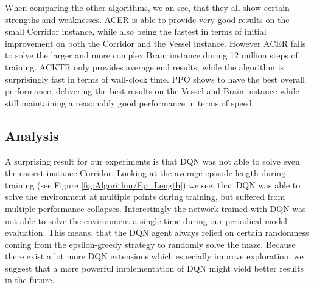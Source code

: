 When comparing the other algorithms, we an see, that they all show certain strengths and weaknesses. ACER is able to provide very good results on the small Corridor instance, while also being the fastest in terms of initial improvement on both the Corridor and the Vessel instance. However ACER fails to solve the larger and more complex Brain instance during 12 million steps of training. ACKTR only provides average end results, while the algorithm is surprisingly fast in terms of wall-clock time. PPO shows to have the best overall performance, delivering the best results on the Vessel and Brain instance while still maintaining a reasonably good performance in terms of speed.   

\subsection{Analysis}
A surprising result for our experiments is that DQN was not able to solve even the easiest instance Corridor. Looking at the average episode length during training (see Figure \ref{fig:Algorithm/Ep_Length}) we see, that DQN was able to solve the environment at multiple points during training, but suffered from multiple performance collapses. Interestingly the network trained with DQN was not able to solve the environment a single time during our periodical model evaluation. This means, that the DQN agent always relied on certain randomness coming from the epsilon-greedy strategy to randomly solve the maze. Because there exist a lot more DQN extensions which especially improve exploration, we suggest that a more powerful implementation of DQN might yield better results in the future.

